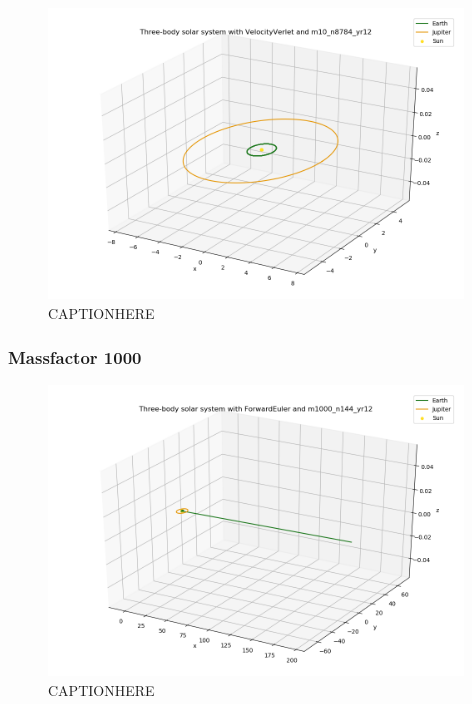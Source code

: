 \documentclass{article}
\begin{document}
    \begin{figure}[H]
        \centering
        \includegraphics[width = 11cm]{img/plot3D_S_E_J_V_m10_n8784_yr12.png}
        \caption{CAPTIONHERE}
        \label{fig:plot3D_S_E_J_V_m10_n8784_yr12}
    \end{figure}

\subsubsection{Massfactor 1000}

    \begin{figure}[H]
        \centering
        \includegraphics[width = 11cm]{img/plot3D_S_E_J_F_m1000_n144_yr12.png}
        \caption{CAPTIONHERE}
        \label{fig:plot3D_S_E_J_F_m1000_n144_yr12}
    \end{figure}
\end{document}
